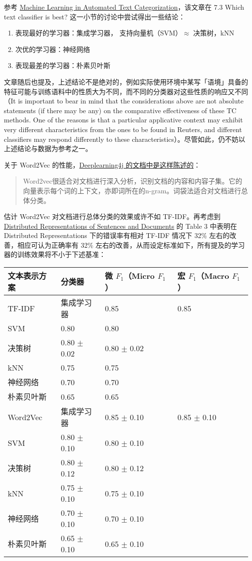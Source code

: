\documentclass[11pt]{article}
\providecommand{\tightlist}{%
      \setlength{\itemsep}{0pt}\setlength{\parskip}{0pt}}
\begin{document}
参考 \href{https://arxiv.org/pdf/cs/0110053.pdf}{Machine Learning in
Automated Text Categorization}，该文章在 7.3 Which text classifier is
best? 这一小节的讨论中尝试得出一些结论：

\begin{enumerate}
\def\labelenumi{\arabic{enumi}.}
\tightlist
\item
  表现最好的学习器：集成学习器， 支持向量机（SVM）\(\approx\)
  决策树，kNN
\item
  次优的学习器：神经网络
\item
  表现最差的学习器：朴素贝叶斯
\end{enumerate}

文章随后也提及，上述结论不是绝对的，例如实际使用环境中某写「语境」具备的特征可能与训练语料中的性质大为不同，而不同的分类器对这些性质的响应又不同（It
is important to bear in mind that the considerations above are not
absolute statements (if there may be any) on the comparative
effectiveness of these TC methods. One of the reasons is that a
particular applicative context may exhibit very different
characteristics from the ones to be found in Reuters, and different
classifiers may respond differently to these
characteristics）。尽管如此，仍不妨以上述结论与数据为参考之一。

关于 Word2Vec
的性能，\href{https://deeplearning4j.org/cn/bagofwords-tf-idf}{Deeplearning4j
的文档中是这样陈述的}：

\begin{quote}
Word2vec很适合对文档进行深入分析，识别文档的内容和内容子集。它的向量表示每个词的上下文，亦即词所在的n-gram。词袋法适合对文档进行总体分类。
\end{quote}

估计 Word2Vec 对文档进行总体分类的效果或许不如
TF-IDF。再考虑到\href{https://arxiv.org/pdf/1405.4053v2.pdf}{Distributed
Representations of Sentences and Documents} 的 Table 3 中表明在
Distributed Representations 下的错误率有相对 TF-IDF 情况下 32\%
左右的改善，相应可认为正确率有 32\%
左右的改善，从而设定标准如下，所有提及的学习器的训练效果将不小于下述基准：

\begin{longtable}[]{@{}llll@{}}
\toprule
文本表示方案 & 分类器 & 微 \(F_1\)（Micro \(F_1\)） & 宏 \(F_1\)（Macro
\(F_1\)）\tabularnewline
\midrule
\endhead
TF-IDF & 集成学习器 & 0.85 & 0.85\tabularnewline
SVM & 0.80 & 0.80\tabularnewline
决策树 & 0.80 \(\pm\) 0.02 & 0.80 \(\pm\) 0.02\tabularnewline
kNN & 0.75 & 0.75\tabularnewline
神经网络 & 0.70 & 0.70\tabularnewline
朴素贝叶斯 & 0.65 & 0.65\tabularnewline
Word2Vec & 集成学习器 & 0.85 \(\pm\) 0.10 & 0.85 \(\pm\)
0.10\tabularnewline
SVM & 0.80 \(\pm\) 0.10 & 0.80 \(\pm\) 0.10\tabularnewline
决策树 & 0.80 \(\pm\) 0.12 & 0.80 \(\pm\) 0.12\tabularnewline
kNN & 0.75 \(\pm\) 0.10 & 0.75 \(\pm\) 0.10\tabularnewline
神经网络 & 0.70 \(\pm\) 0.10 & 0.70 \(\pm\) 0.10\tabularnewline
朴素贝叶斯 & 0.65 \(\pm\) 0.10 & 0.65 \(\pm\) 0.10\tabularnewline
\bottomrule
\end{longtable}
\end{document}

